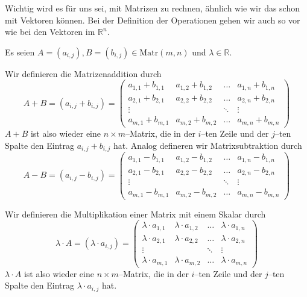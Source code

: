 \setcounter{definition}{0}
\setcounter{beispiel}{0}
\setcounter{notiz}{0}


Wichtig wird es für uns sei, mit Matrizen zu rechnen, ähnlich wie wir das schon mit Vektoren können. 
Bei der Definition der Operationen gehen wir auch so vor wie bei den Vektoren im $\mathbb R^n$.

\begin{definition} Es seien $A = \left(a_{i,j}\right), B = \left( b_{i,j} \right) \in \textrm{Matr}(m,n)$ 
und $\lambda \in \mathbb R$. 

Wir definieren die Matrizenaddition durch 
  	$$ A + B = \left(a_{i,j} + b_{i,j}\right) = 
	\left(\begin{matrix} 
    	a_{1,1} + b_{1,1} & a_{1,2} + b_{1,2} & \ldots & a_{1,n} + b_{1,n} \\
 	a_{2,1} + b_{2,1} & a_{2,2} + b_{2,2} & \ldots & a_{2,n} + b_{2,n} \\
 	\vdots & & \ddots & \vdots \\
 	a_{m,1} + b_{m,1} & a_{m,2} + b_{m,2} & \ldots & a_{m,n} + b_{m,n}
    	\end{matrix} \right) $$
$A+B$ ist also wieder eine $n \times m$--Matrix, die in der $i$--ten Zeile und der $j$--ten Spalte den Eintrag 
$a_{i,j} + b_{i,j}$ hat. Analog defineren wir Matrixsubtraktion durch 
  	$$ A - B = \left(a_{i,j} - b_{i,j}\right) = \left(\begin{matrix} 
  	a_{1,1} - b_{1,1} & a_{1,2} - b_{1,2} & \ldots & a_{1,n} - b_{1,n} \\
	a_{2,1} - b_{2,1} & a_{2,2} - b_{2,2} & \ldots & a_{2,n} - b_{2,n} \\
 	\vdots & & \ddots & \vdots \\
	a_{m,1} - b_{m,1} & a_{m,2} - b_{m,2} & \ldots & a_{m,n} - b_{m,n}
	\end{matrix} \right) $$

Wir definieren die Multiplikation einer Matrix mit einem Skalar durch
  	$$ \lambda \cdot A = \left(\lambda \cdot a_{i,j}\right) = \left(\begin{matrix} 
   	\lambda \cdot a_{1,1}  & \lambda \cdot a_{1,2}  & \ldots & \lambda \cdot a_{1,n}  \\
 	\lambda \cdot a_{2,1}  & \lambda \cdot a_{2,2}  & \ldots & \lambda \cdot a_{2,n}  \\
 	\vdots & & \ddots & \vdots \\
  	\lambda \cdot a_{m,1}  & \lambda \cdot a_{m,2}  & \ldots & \lambda \cdot a_{m,n}
   	\end{matrix} \right) $$
$\lambda \cdot A$ ist also wieder eine $n \times m$--Matrix, die in der $i$--ten Zeile und der $j$--ten Spalte 
den Eintrag  $ \lambda \cdot a_{i,j}$ hat.
\end{definition}
      

